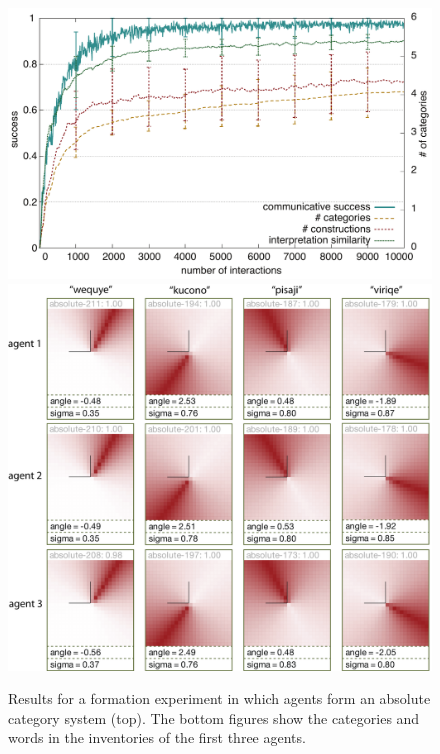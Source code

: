 \begin{figure}
\begin{center}
\includegraphics[width=0.85\columnwidth]{figs/category-formation-absolute-results+categories-1}
\includegraphics[width=0.85\columnwidth]{figs/category-formation-absolute-results+categories-2.png}
\end{center}
\caption[Results formation of absolute category systems]{Results 
for a formation experiment in which agents form
an absolute category system (top). 
The bottom figures show the categories and words
in the inventories of the first three agents.}
\label{f:category-formation-absolute-results}
\end{figure}

